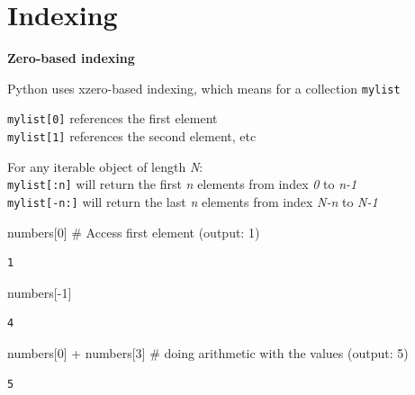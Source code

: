 \documentclass[
  letterpaper,
  DIV=11,
  numbers=noendperiod]{scrreprt}
\newenvironment{Shaded}{\begin{snugshade}}{\end{snugshade}}
\newcommand{\CommentTok}[1]{\textcolor[rgb]{0.37,0.37,0.37}{#1}}
\newcommand{\DecValTok}[1]{\textcolor[rgb]{0.68,0.00,0.00}{#1}}
\newcommand{\NormalTok}[1]{\textcolor[rgb]{0.00,0.23,0.31}{#1}}
\newcommand{\OperatorTok}[1]{\textcolor[rgb]{0.37,0.37,0.37}{#1}}
\begin{document}
\hypertarget{indexing-2}{%
\section{Indexing}\label{indexing-2}}

\textbf{Zero-based indexing}

Python uses xzero-based indexing, which means for a collection
\texttt{mylist}

\texttt{mylist{[}0{]}} references the first element\\
\texttt{mylist{[}1{]}} references the second element, etc

For any iterable object of length \emph{N}:\\
\texttt{mylist{[}:n{]}} will return the first \emph{n} elements from
index \emph{0} to \emph{n-1}\\
\texttt{mylist{[}-n:{]}} will return the last \emph{n} elements from
index \emph{N-n} to \emph{N-1}

\begin{Shaded}
\begin{Highlighting}[]
\NormalTok{numbers[}\DecValTok{0}\NormalTok{] }\CommentTok{\# Access first element (output: 1)}
\end{Highlighting}
\end{Shaded}

\begin{verbatim}
1
\end{verbatim}

\begin{Shaded}
\begin{Highlighting}[]
\NormalTok{numbers[}\OperatorTok{{-}}\DecValTok{1}\NormalTok{]}
\end{Highlighting}
\end{Shaded}

\begin{verbatim}
4
\end{verbatim}

\begin{Shaded}
\begin{Highlighting}[]
\NormalTok{numbers[}\DecValTok{0}\NormalTok{] }\OperatorTok{+}\NormalTok{ numbers[}\DecValTok{3}\NormalTok{] }\CommentTok{\# doing arithmetic with the values (output: 5)}
\end{Highlighting}
\end{Shaded}

\begin{verbatim}
5
\end{verbatim}
\end{document}
